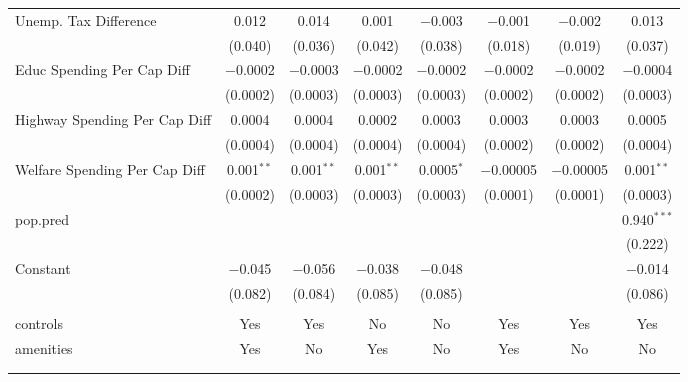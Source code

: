 \begin{table}[!htbp]
\begin{tabular}{@{\extracolsep{5pt}}lccccccc}
  Unemp. Tax Difference & 0.012 & 0.014 & 0.001 & $-$0.003 & $-$0.001 & $-$0.002 & 0.013 \\ 
  & (0.040) & (0.036) & (0.042) & (0.038) & (0.018) & (0.019) & (0.037) \\ 
  Educ Spending Per Cap Diff & $-$0.0002 & $-$0.0003 & $-$0.0002 & $-$0.0002 & $-$0.0002 & $-$0.0002 & $-$0.0004 \\ 
  & (0.0002) & (0.0003) & (0.0003) & (0.0003) & (0.0002) & (0.0002) & (0.0003) \\ 
  Highway Spending Per Cap Diff & 0.0004 & 0.0004 & 0.0002 & 0.0003 & 0.0003 & 0.0003 & 0.0005 \\ 
  & (0.0004) & (0.0004) & (0.0004) & (0.0004) & (0.0002) & (0.0002) & (0.0004) \\ 
  Welfare Spending Per Cap Diff & 0.001$^{**}$ & 0.001$^{**}$ & 0.001$^{**}$ & 0.0005$^{*}$ & $-$0.00005 & $-$0.00005 & 0.001$^{**}$ \\ 
  & (0.0002) & (0.0003) & (0.0003) & (0.0003) & (0.0001) & (0.0001) & (0.0003) \\ 
  pop.pred &  &  &  &  &  &  & 0.940$^{***}$ \\ 
  &  &  &  &  &  &  & (0.222) \\ 
  Constant & $-$0.045 & $-$0.056 & $-$0.038 & $-$0.048 &  &  & $-$0.014 \\ 
  & (0.082) & (0.084) & (0.085) & (0.085) &  &  & (0.086) \\ 
 \hline \\[-1.8ex] 
controls & Yes & Yes & No & No & Yes & Yes & Yes \\ 
amenities & Yes & No & Yes & No & Yes & No & No \\ 
\hline \\[-1.8ex] 
\hline 
\hline \\[-1.8ex] 
\end{tabular} 
\end{table} 
